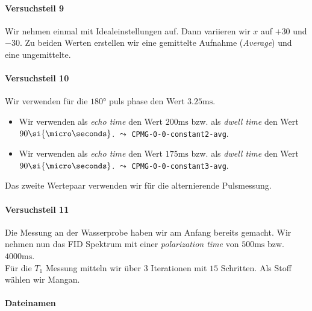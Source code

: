 \documentclass{subfiles}
\begin{document}
        \paragraph*{Versuchsteil 9}
            Wir nehmen einmal mit Idealeinstellungen auf. Dann variieren wir $x$ auf $+30$ und $-30$. Zu beiden Werten erstellen wir eine gemittelte Aufnahme (\emph{Average}) und eine ungemittelte.


        \paragraph*{Versuchsteil 10}
            Wir verwenden für die $180\si{\degree}$ puls phase den Wert $3.25\si{\ms}$. 
            \begin{itemize}
                \item Wir verwenden als \emph{echo time} den Wert $200\si{\ms}$ bzw. als \emph{dwell time} den Wert $90\si{\micro\seconds}$. $\leadsto$ \texttt{CPMG-0-0-constant2-avg}.
                \item Wir verwenden als \emph{echo time} den Wert $175\si{\ms}$ bzw. als \emph{dwell time} den Wert $90\si{\micro\seconds}$. $\leadsto$ \texttt{CPMG-0-0-constant3-avg}.
            \end{itemize}
            Das zweite Wertepaar verwenden wir für die alternierende Pulsmessung. 

        \paragraph*{Versuchsteil 11}
            Die Messung an der Wasserprobe haben wir am Anfang bereits gemacht. Wir nehmen nun das FID Spektrum mit einer \emph{polarization time} von $500\si{\ms}$ bzw. $4000\si{\ms}$. \\

            Für die $T_1$ Messung mitteln wir über $3$ Iterationen mit $15$ Schritten. Als Stoff wählen wir Mangan.


        \paragraph*{Dateinamen}
\end{document}
